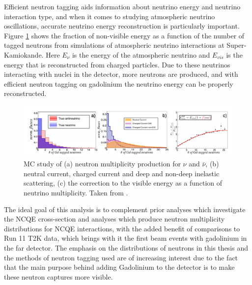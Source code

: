 Efficient neutron tagging aids information about neutrino energy and neutrino interaction type, and when it comes to studying atmospheric neutrino oscillations, accurate neutrino energy reconstruction is particularly important. Figure \ref{fig:atm_nu_energy} shows the fraction of non-visible energy as a function of the number of tagged neutrons from simulations of atmospheric neutrino interactions at Super-Kamiokande. Here $E_{\nu}$ is the energy of the atmospheric neutrino and $E_{vis}$ is the energy that is reconstructed from charged particles. Due to these neutrinos interacting with nuclei in the detector, more neutrons are produced, and with efficient neutron tagging on gadolinium the neutrino energy can be properly reconstructed. 

\begin{figure}[H]
    \includegraphics[width=\textwidth]{Figures/atm_recon_energy.png}
\caption{MC study of (a) neutron multiplicity production for $\nu$ and ${\bar{\nu}}$, (b) neutral current, charged current and deep and non-deep inelastic scattering, (c) the correction to the visible energy as a function of neutrino multiplicity. Taken from \cite{marti_evaluation_2020}.}
\label{fig:atm_nu_energy}
\end{figure}



The ideal goal of this analysis is to complement prior analyses which investigate the NCQE cross-section and analyses which produce neutron multiplicity distributions for NCQE interactions, with the added benefit of comparisons to Run 11 T2K data, which brings with it the first beam events with gadolinium in the far detector. The emphasis on the distributions of neutrons in this thesis and the methods of neutron tagging used are of increasing interest due to the fact that the main purpose behind adding Gadolinium to the detector is to make these neutron captures more visible. 


